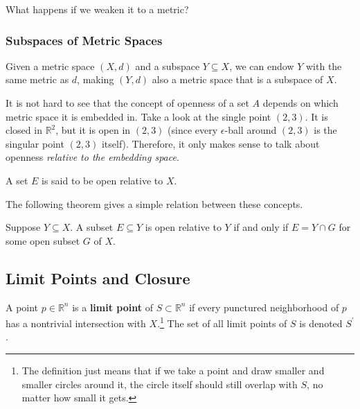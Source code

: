       What happens if we weaken it to a metric? 

    \subsubsection{Subspaces of Metric Spaces}

      \begin{definition}
        Given a metric space $(X, d)$ and a subspace $Y \subseteq X$, we can endow $Y$ with the same metric as $d$, making $(Y, d)$ also a metric space that is a subspace of $X$. 
      \end{definition}

      It is not hard to see that the concept of openness of a set $A$ depends on which metric space it is embedded in. Take a look at the single point $(2, 3)$. It is closed in $\mathbb{R}^2$, but it is open in $(2, 3)$ (since every $\epsilon$-ball around $(2, 3)$ is the singular point $(2, 3)$ itself). Therefore, it only makes sense to talk about openness \textit{relative to the embedding space}. 

      \begin{definition}
        A set $E$ is said to be open relative to $X$. 
      \end{definition}

      The following theorem gives a simple relation between these concepts. 

      \begin{theorem}
        Suppose $Y \subseteq X$. A subset $E \subseteq Y$ is open relative to $Y$ if and only if $E = Y \cap G$ for some open subset $G$ of $X$. 
      \end{theorem}

  \subsection{Limit Points and Closure} 

    \begin{definition}
      A point $p \in \mathbb{R}^n$ is a \textbf{limit point} of $S \subset \mathbb{R}^n$ if every punctured neighborhood of $p$ has a nontrivial intersection with $X$.\footnote{The definition just means that if we take a point and draw smaller and smaller circles around it, the circle itself should still overlap with $S$, no matter how small it gets. } The set of all limit points of $S$ is denoted $S^\prime$. 
    \end{definition}

